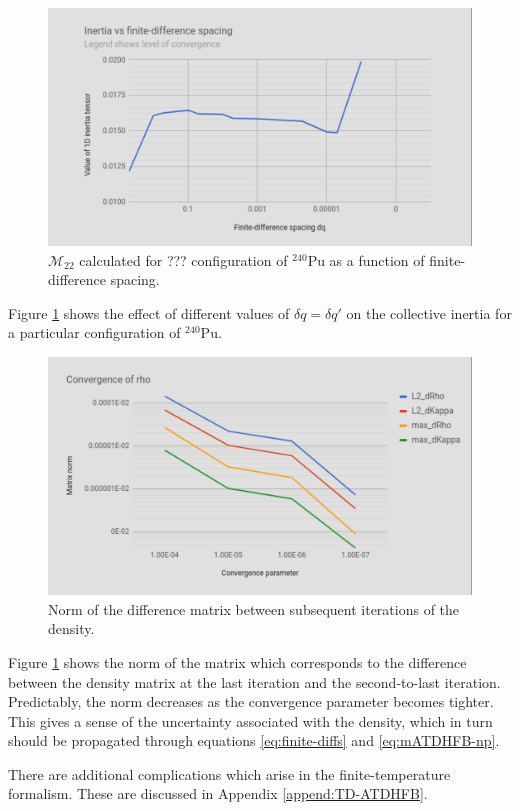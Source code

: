 \begin{figure}
	\centering
	\includegraphics[width=0.7\linewidth]{TeX_files/Num-dq_spacing}
	\caption[Collective inertia as a function of finite-difference spacing]{$\mathcal{M}_{22}$ calculated for ??? configuration of $^{240}$Pu as a function of finite-difference spacing.}
	\label{fig:num-dqspacing}
\end{figure}

Figure \ref{fig:num-dqspacing} shows the effect of different values of $\delta q = \delta q'$ on the collective inertia for a particular configuration of $^{240}$Pu.

\begin{figure}
	\centering
	\includegraphics[width=0.7\linewidth]{TeX_files/Num-rho_conv}
	\caption[Norm of the difference matrix between subsequent iterations of the density]{Norm of the difference matrix between subsequent iterations of the density.}
	\label{fig:num-rhoconv}
\end{figure}

Figure \ref{fig:num-dqspacing} shows the norm of the matrix which corresponds to the difference between the density matrix at the last iteration and the second-to-last iteration. Predictably, the norm decreases as the convergence parameter becomes tighter. This gives a sense of the uncertainty associated with the density, which in turn should be propagated through equations \ref{eq:finite-diffs} and \ref{eq:mATDHFB-np}.

There are additional complications which arise in the finite-temperature formalism. These are discussed in Appendix \ref{append:TD-ATDHFB}.

